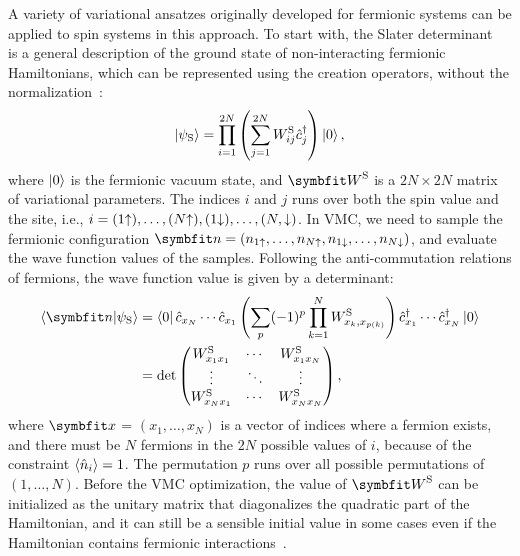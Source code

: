A variety of variational ansatzes originally developed for fermionic systems can be applied to spin systems in this approach. To start with, the Slater determinant~\cite{slater1929theory} is a general description of the ground state of non-interacting fermionic Hamiltonians, which can be represented using the creation operators, without the normalization~\cite{toulouse2007optimization}:
\begin{equation}
\ket{\psi_\text{S}} = \prod_{i = 1}^{2 N} \left( \sum_{j = 1}^{2 N} W^\text{S}_{i j} \hat{c}^\dagger_j \right) \ket{0},
\end{equation}
where $\ket{0}$ is the fermionic vacuum state, and $\mW^\text{S}$ is a $2 N \times 2 N$ matrix of variational parameters. The indices $i$ and $j$ runs over both the spin value and the site, i.e., $i = (1 {\uparrow}), \ldots, (N {\uparrow}), (1 {\downarrow}), \ldots, (N, {\downarrow})$. In VMC, we need to sample the fermionic configuration $\vn = (n_{1 \spinup}, \ldots, n_{N \spinup}, n_{1 \spindown}, \ldots, n_{N \spindown})$, and evaluate the wave function values of the samples. Following the anti-commutation relations of fermions, the wave function value is given by a determinant:
\begin{align}
\ip{\vn}{\psi_\text{S}} &= \bra{0} \hat{c}_{x_N} \cdots \hat{c}_{x_1} \left( \sum_p (-1)^p \prod_{k = 1}^N W^\text{S}_{x_k, x_{p(k)}} \right) \hat{c}^\dagger_{x_1} \cdots \hat{c}^\dagger_{x_N} \ket{0} \\
&= \det \begin{pmatrix}
W^\text{S}_{x_1 x_1} & \cdots & W^\text{S}_{x_1 x_N} \\
\vdots & \ddots & \vdots \\
W^\text{S}_{x_N x_1} & \cdots & W^\text{S}_{x_N x_N}
\end{pmatrix},
\end{align}
where $\vx$ = $(x_1, \ldots, x_N)$ is a vector of indices where a fermion exists, and there must be $N$ fermions in the $2 N$ possible values of $i$, because of the constraint $\ev{\hat{n}_i} = 1$. The permutation $p$ runs over all possible permutations of $(1, \ldots, N)$. Before the VMC optimization, the value of $\mW^\text{S}$ can be initialized as the unitary matrix that diagonalizes the quadratic part of the Hamiltonian, and it can still be a sensible initial value in some cases even if the Hamiltonian contains fermionic interactions~\cite{yokoyama1987variational, gross1987Antiferromagnetic, ferrari2022charge}.

